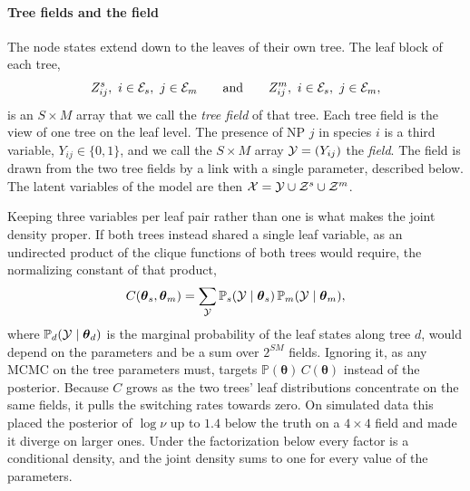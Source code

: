 \documentclass[
11pt, %
oneside, %
english, %
singlespacing, %
headsepline, %
chapterinoneline, %
]{MastersDoctoralThesis} %
\def\P{\mathbb{P}}
\def\btheta{\boldsymbol{\theta}}
\def\E{{\cal E}}
\def\X{{\cal X}}
\def\Y{{\cal Y}}
\def\Z{{\cal Z}}
\begin{document}
\paragraph{Tree fields and the field} The node states extend down to the leaves of their own tree. The leaf block of each tree,
\begin{equation*}
	Z^s_{ij},\ i \in \E_s,\ j \in \E_m \qquad\text{and}\qquad Z^m_{ij},\ i \in \E_s,\ j \in \E_m,
\end{equation*}
is an $S \times M$ array that we call the \emph{tree field} of that tree. Each tree field is the view of one tree on the leaf level. The presence of NP $j$ in species $i$ is a third variable, $Y_{ij} \in \{0,1\}$, and we call the $S \times M$ array $\Y = (Y_{ij})$ the \emph{field}. The field is drawn from the two tree fields by a link with a single parameter, described below. The latent variables of the model are then $\X = \Y \cup \Z^s \cup \Z^m$.

Keeping three variables per leaf pair rather than one is what makes the joint density proper. If both trees instead shared a single leaf variable, as an undirected product of the clique functions of both trees would require, the normalizing constant of that product,
\begin{equation*}
	C(\btheta_s, \btheta_m) = \sum_{\Y} \P_s(\Y \mid \btheta_s)\, \P_m(\Y \mid \btheta_m),
\end{equation*}
where $\P_d(\Y \mid \btheta_d)$ is the marginal probability of the leaf states along tree $d$, would depend on the parameters and be a sum over $2^{SM}$ fields. Ignoring it, as any MCMC on the tree parameters must, targets $\P(\btheta)\,C(\btheta)$ instead of the posterior. Because $C$ grows as the two trees' leaf distributions concentrate on the same fields, it pulls the switching rates towards zero. On simulated data this placed the posterior of $\log \nu$ up to $1.4$ below the truth on a $4 \times 4$ field and made it diverge on larger ones. Under the factorization below every factor is a conditional density, and the joint density sums to one for every value of the parameters.
\end{document}
